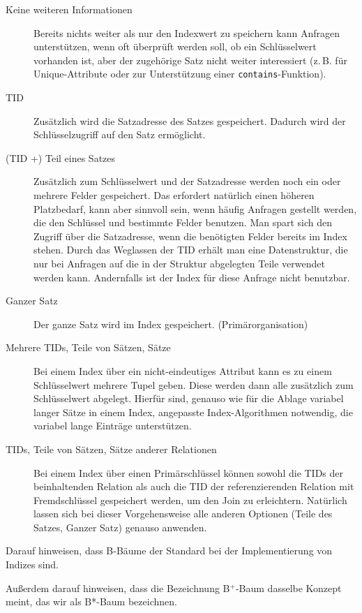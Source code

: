 \begin{enumerate}[a)]
\begin{solution}
		\begin{description}
			\item[Keine weiteren Informationen] Bereits nichts weiter als nur den Indexwert zu speichern kann Anfragen unterstützen, wenn oft überprüft werden soll, ob ein Schlüsselwert vorhanden ist, aber der zugehörige Satz nicht weiter interessiert (z.\,B. für Unique-Attribute oder zur Unterstützung einer \texttt{contains}-Funktion).
			\item[TID] Zusätzlich wird die Satzadresse des Satzes gespeichert. Dadurch wird der Schlüsselzugriff auf den Satz ermöglicht.
			\item[(TID +) Teil eines Satzes] Zusätzlich zum Schlüsselwert und der Satzadresse werden noch ein oder mehrere Felder gespeichert. Das erfordert natürlich einen höheren Platzbedarf, kann aber sinnvoll sein, wenn häufig Anfragen
			gestellt werden, die den Schlüssel und bestimmte Felder benutzen. Man spart sich den Zugriff über die Satzadresse, wenn die benötigten Felder bereits im Index stehen.
			Durch das Weglassen der TID erhält man eine Datenstruktur, die nur bei Anfragen auf die in der Struktur abgelegten Teile verwendet werden kann. Andernfalls ist der Index für diese Anfrage nicht benutzbar.
			\item[Ganzer Satz] Der ganze Satz wird im Index gespeichert. (Primärorganisation)
			\item[Mehrere TIDs, Teile von Sätzen, Sätze] Bei einem Index über ein nicht-eindeutiges Attribut kann es zu einem Schlüsselwert mehrere Tupel geben. Diese werden dann alle zusätzlich zum Schlüsselwert abgelegt. Hierfür sind, genauso wie für die Ablage variabel langer Sätze in einem Index, angepasste Index-Algorithmen notwendig, die variabel lange Einträge unterstützen.
			\item[TIDs, Teile von Sätzen, Sätze anderer Relationen] Bei einem Index über einen Primärschlüssel können sowohl die TIDs der beinhaltenden Relation als auch die TID der referenzierenden Relation mit Fremdschlüssel gespeichert werden, um den Join zu erleichtern. Natürlich lassen sich bei dieser Vorgehensweise alle anderen Optionen (Teile des Satzes, Ganzer Satz) genauso anwenden.
		\end{description}

	\end{solution}
\end{enumerate}

\begin{note}
Darauf hinweisen, dass B-Bäume der Standard bei der Implementierung von Indizes sind.

Außerdem darauf hinweisen, dass die Bezeichnung B$^\text{+}$-Baum dasselbe Konzept
meint, das wir als B*-Baum bezeichnen.
\end{note}


